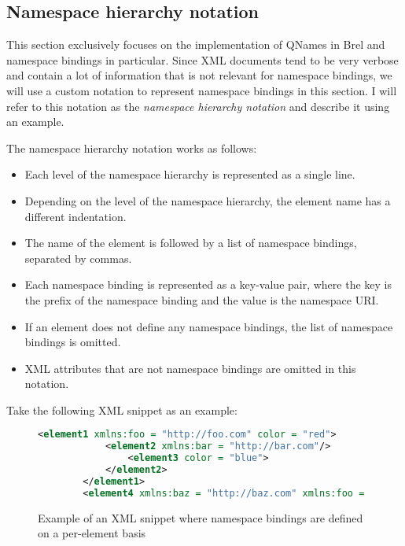 \subsection{Namespace hierarchy notation}

This section exclusively focuses on the implementation of QNames in Brel and namespace bindings in particular. 
Since XML documents tend to be very verbose and contain a lot of information that is not relevant for namespace bindings,
we will use a custom notation to represent namespace bindings in this section. 
I will refer to this notation as the \textit{namespace hierarchy notation} and describe it using an example.

The namespace hierarchy notation works as follows:

\begin{itemize}
    \item Each level of the namespace hierarchy is represented as a single line.
    \item Depending on the level of the namespace hierarchy, the element name has a different indentation.
    \item The name of the element is followed by a list of namespace bindings, separated by commas.
    \item Each namespace binding is represented as a key-value pair, where the key is the prefix of the namespace binding and the value is the namespace URI.
    \item If an element does not define any namespace bindings, the list of namespace bindings is omitted.
    \item XML attributes that are not namespace bindings are omitted in this notation.
\end{itemize}

Take the following XML snippet as an example:

\begin{figure}[H]
    \caption{Example of an XML snippet where namespace bindings are defined on a per-element basis}
    \label{fig:xml_namespace_notation_example}
    \begin{lstlisting}[language=XML]
        <element1 xmlns:foo = "http://foo.com" color = "red">
            <element2 xmlns:bar = "http://bar.com"/>
                <element3 color = "blue">
            </element2>
        </element1>
        <element4 xmlns:baz = "http://baz.com" xmlns:foo = "http://other-foo.com">
    \end{lstlisting}
\end{figure}

